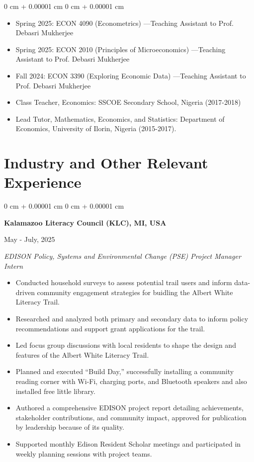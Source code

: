 \documentclass[10pt, letterpaper]{article}
\newenvironment{onecolentry}{
    \begin{adjustwidth}{
        0 cm + 0.00001 cm
    }{
        0 cm + 0.00001 cm
    }
}{
    \end{adjustwidth}
} %
\newenvironment{twocolentry}[2][]{
    \onecolentry
    \def\secondColumn{#2}
    \setcolumnwidth{\fill, 4.5 cm}
    \begin{paracol}{2}
}{
    \switchcolumn \raggedleft \secondColumn
    \end{paracol}
    \endonecolentry
} %
\begin{document}
      
        \begin{onecolentry}
        \begin{itemize}
            \item Spring 2025: ECON 4090 (Econometrics) —Teaching Assistant to Prof. Debasri Mukherjee
            \item Spring 2025: ECON 2010 (Principles of Microeconomics)  —Teaching Assistant to Prof. Debasri Mukherjee
            \item Fall 2024: ECON 3390 (Exploring Economic Data)  —Teaching Assistant to Prof. Debasri Mukherjee
            \item Class Teacher, Economics: SSCOE Secondary School, Nigeria (2017-2018) 
            \item Lead Tutor, Mathematics, Economics, and Statistics: Department of Economics, University of Ilorin, Nigeria (2015-2017). 


        \end{itemize}
            \end{onecolentry}

    
    \section{Industry and Other Relevant Experience}

\begin{twocolentry}{
    May - July, 2025 }
    \textbf{Kalamazoo Literacy Council (KLC), MI, USA}
\end{twocolentry}

\textit{EDISON Policy, Systems and Environmental Change (PSE) Project Manager Intern }
    \begin{itemize}
       \item Conducted household surveys to assess potential trail users and inform data-driven community engagement strategies for buidling the Albert White Literacy Trail.
        \item Researched and analyzed both primary and secondary data to inform policy recommendations and support grant applications for the trail.
        \item Led focus group discussions with local residents to shape the design and features of the Albert White Literacy Trail.
        \item Planned and executed “Build Day,” successfully installing a community reading corner with Wi-Fi, charging ports, and Bluetooth speakers and also installed free little library.
        \item Authored a comprehensive EDISON project report detailing achievements, stakeholder contributions, and community impact, approved for publication by leadership because of its quality.
        \item Supported monthly Edison Resident Scholar meetings and participated in weekly planning sessions with project teams.
    \end{itemize}
\end{document}
